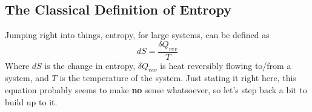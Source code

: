 \subsection{The Classical Definition of Entropy}
Jumping right into things, entropy, for large systems, can be defined as
\begin{equation}
    dS=\frac{\delta Q_{rev}}{T}
\end{equation}
Where $dS$ is the change in entropy, $\delta Q_{rev}$ is heat reversibly flowing to/from a system, and $T$ is the temperature of the system. Just stating it right here, this equation probably seems to make \textbf{no} sense whatsoever, so let's step back a bit to build up to it.



